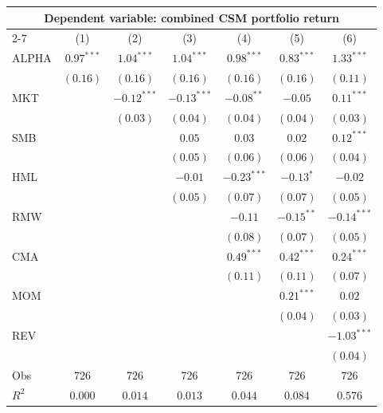 \begin{tabular}{lcccccc}
  \hline \multicolumn{7}{c}{Dependent variable: combined CSM portfolio return} \\
 \cmidrule(l){2-7} \vspace{5pt}  & (1) & (2) & (3) & (4) & (5) & (6) \\ 
  ALPHA & $0.97^{***}$ & $1.04^{***}$ & $1.04^{***}$ & $0.98^{***}$ & $0.83^{***}$ & $1.33^{***}$ \\ 
   & $(0.16)$ & $(0.16)$ & $(0.16)$ & $(0.16)$ & $(0.16)$ & $(0.11)$ \\ 
  MKT &  & $-0.12^{***}$ & $-0.13^{***}$ & $-0.08^{**}$ & $-0.05$ & $0.11^{***}$ \\ 
   &  & $(0.03)$ & $(0.04)$ & $(0.04)$ & $(0.04)$ & $(0.03)$ \\ 
  SMB &  &  & $0.05$ & $0.03$ & $0.02$ & $0.12^{***}$ \\ 
   &  &  & $(0.05)$ & $(0.06)$ & $(0.06)$ & $(0.04)$ \\ 
  HML &  &  & $-0.01$ & $-0.23^{***}$ & $-0.13^{*}$ & $-0.02$ \\ 
   &  &  & $(0.05)$ & $(0.07)$ & $(0.07)$ & $(0.05)$ \\ 
  RMW &  &  &  & $-0.11$ & $-0.15^{**}$ & $-0.14^{***}$ \\ 
   &  &  &  & $(0.08)$ & $(0.07)$ & $(0.05)$ \\ 
  CMA &  &  &  & $0.49^{***}$ & $0.42^{***}$ & $0.24^{***}$ \\ 
   &  &  &  & $(0.11)$ & $(0.11)$ & $(0.07)$ \\ 
  MOM &  &  &  &  & $0.21^{***}$ & $0.02$ \\ 
   &  &  &  &  & $(0.04)$ & $(0.03)$ \\ 
  REV &  &  &  &  &  & $-1.03^{***}$ \\ 
   \vspace{5pt} &  &  &  &  &  & $(0.04)$ \\ 
  Obs & 726 & 726 & 726 & 726 & 726 & 726 \\ 
  $R^2$ & $0.000$ & $0.014$ & $0.013$ & $0.044$ & $0.084$ & $0.576$ \\ 
   \bottomrule\end{tabular}
